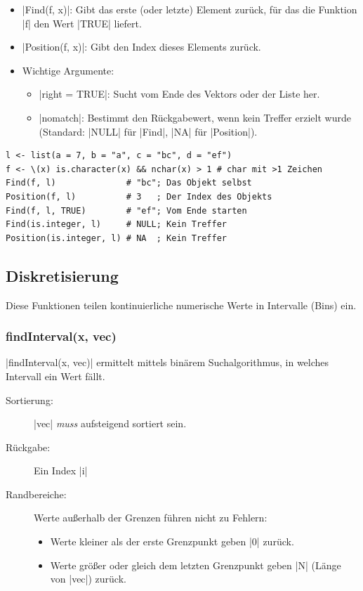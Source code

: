 \documentclass[10pt,twocolumn]{scrartcl}
\renewcommand{\lstinline}{\mycoloredinline}
\begin{document}
\begin{itemize}
\item \lstinline|Find(f, x)|: Gibt das erste (oder letzte) Element zurück, für das die Funktion \lstinline|f| den Wert \lstinline|TRUE| liefert.
\item \lstinline|Position(f, x)|: Gibt den Index dieses Elements zurück.
\item Wichtige Argumente:
  \begin{itemize}
  \item \lstinline|right = TRUE|: Sucht vom Ende des Vektors oder der Liste her.
  \item \lstinline|nomatch|: Bestimmt den Rückgabewert, wenn kein Treffer erzielt wurde (Standard: \lstinline|NULL| für \lstinline|Find|, \lstinline|NA| für \lstinline|Position|).
  \end{itemize}
\end{itemize}

\begin{lstlisting}
l <- list(a = 7, b = "a", c = "bc", d = "ef")
f <- \(x) is.character(x) && nchar(x) > 1 # char mit >1 Zeichen
Find(f, l)              # "bc"; Das Objekt selbst
Position(f, l)          # 3   ; Der Index des Objekts
Find(f, l, TRUE)        # "ef"; Vom Ende starten
Find(is.integer, l)     # NULL; Kein Treffer
Position(is.integer, l) # NA  ; Kein Treffer
\end{lstlisting}


\subsection{Diskretisierung}

Diese Funktionen teilen kontinuierliche numerische Werte in Intervalle (Bins) ein.

\subsubsection{findInterval(x, vec)}

\lstinline|findInterval(x, vec)| ermittelt mittels binärem Suchalgorithmus, in welches Intervall ein Wert fällt.

\begin{description}
\item[Sortierung:] \lstinline|vec| \emph{muss} aufsteigend sortiert sein.
\item[Rückgabe:] Ein Index \lstinline|i|
\item[Randbereiche:] Werte außerhalb der Grenzen führen nicht zu Fehlern: 
  \begin{itemize}
  \item Werte kleiner als der erste Grenzpunkt geben \lstinline|0| zurück.
  \item Werte größer oder gleich dem letzten Grenzpunkt geben \lstinline|N| (Länge von \lstinline|vec|) zurück.
  \end{itemize}
\end{description}
\end{document}
